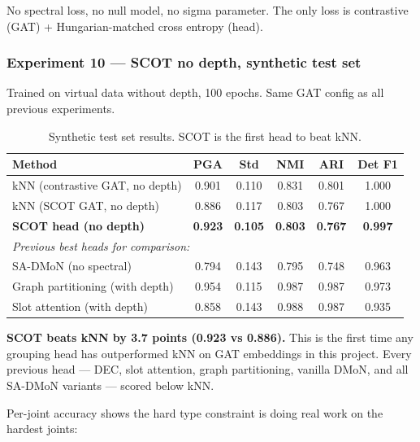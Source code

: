 No spectral loss, no null model, no sigma parameter. The only loss is contrastive (GAT) + Hungarian-matched cross entropy (head).


\subsubsection{Experiment 10 --- SCOT no depth, synthetic test set}

Trained on virtual data without depth, 100 epochs. Same GAT config as all previous experiments.

\begin{table}[H]
\centering
\footnotesize
\begin{tabular}{lccccc}
\toprule
Method & PGA & Std & NMI & ARI & Det F1 \\
\midrule
kNN (contrastive GAT, no depth) & 0.901 & 0.110 & 0.831 & 0.801 & 1.000 \\
kNN (SCOT GAT, no depth) & 0.886 & 0.117 & 0.803 & 0.767 & 1.000 \\
\textbf{SCOT head (no depth)} & \textbf{0.923} & \textbf{0.105} & \textbf{0.803} & \textbf{0.767} & \textbf{0.997} \\
\midrule
\multicolumn{6}{l}{\textit{Previous best heads for comparison:}} \\
SA-DMoN (no spectral) & 0.794 & 0.143 & 0.795 & 0.748 & 0.963 \\
Graph partitioning (with depth) & 0.954 & 0.115 & 0.987 & 0.987 & 0.973 \\
Slot attention (with depth) & 0.858 & 0.143 & 0.988 & 0.987 & 0.935 \\
\bottomrule
\end{tabular}
\caption{Synthetic test set results. SCOT is the first head to beat kNN.}
\end{table}

\textbf{SCOT beats kNN by 3.7 points (0.923 vs 0.886).} This is the first time any grouping head has outperformed kNN on GAT embeddings in this project. Every previous head --- DEC, slot attention, graph partitioning, vanilla DMoN, and all SA-DMoN variants --- scored below kNN.

Per-joint accuracy shows the hard type constraint is doing real work on the hardest joints:

